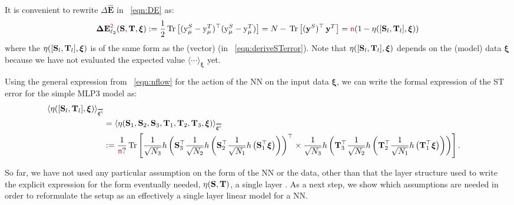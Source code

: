 It is convenient to rewrite $\Delta \mathbf{\hat{E}}$ in \EQN~\ref{eqn:DE} as:
\begin{align}
\label{eqn:DE2}
\mathbf{\Delta {E}}^{{\color{red}\sf{2}}}_{\ell_2}({\mathbf{S}},{\mathbf{T}}, \boldsymbol{\xi})
   := \frac{1}{2} \mbox{}\operatorname{Tr}\left[ (\mathrm{y}_{\mu}^{S} - \mathrm{y}_{\mu}^{T})^\top (\mathrm{y}_{\mu}^{S} - \mathrm{y}_{\mu}^{T}) \right]
   = N - \mbox{}\operatorname{Tr}\left[ (\mathbf{y}^{S})^{\top} \, \mathbf{y}^{T}  \right]
   = {\color{red}\sf{n}}(1 - \eta([{\mathbf{S}}_l,{\mathbf{T}}_l],\boldsymbol{\xi}))
\end{align}
where the \SelfOverlap $\eta([{\mathbf{S}}_l,{\mathbf{T}}_l],\boldsymbol{\xi})$
is of the same form as the (vector) \LinearPerceptron (in \EQN~\ref{eqn:deriveSTerror}).
Note that $\eta([{\mathbf{S}}_l,{\mathbf{T}}_l],\boldsymbol{\xi})$ depends on the (model) data $\boldsymbol{\xi}$
because we have not evaluated the expected value $\langle \cdots \rangle_{\boldsymbol{\xi}}$ yet.

Using the general expression from \EQN~\ref{eqn:nflow} for the action of the NN on the input data $\boldsymbol{\xi}$,
we can write the formal expression of the ST error for the simple MLP3 model as:
\begin{align}
\label{eqn:overlap1}
\ETAMLPAVG  \\ \nonumber
& =\langle\ETA(\SMAT_1,\SMAT_2,\SMAT_3,\TMAT_1,\TMAT_2,\TMAT_3,\boldsymbol{\xi})\rangle_{\AVGNDXI}  \\ \nonumber
& :=  \frac{1}{\ND ?}\Trace{
    \frac{1}{\sqrt{N_3}} h\left(\SMAT_3^{\top} 
    \frac{1}{\sqrt{N_2}} h\left(\SMAT_2^{\top} 
    \frac{1}{\sqrt{N_1}} h\left(\SMAT_1^{\top} \boldsymbol{\xi} \right)\right)\right)^{\top} 
    \times
    \frac{1}{\sqrt{N_3}} h\left(\TMAT_3^{\top} 
    \frac{1}{\sqrt{N_2}} h\left(\TMAT_2^{\top} 
    \frac{1}{\sqrt{N_1}} h\left(\TMAT_1^{\top} \boldsymbol{\xi} \right)\right)\right)
  }.
\end{align}

So far, we have not used any particular assumption on the form of the NN or the data, 
other than that the layer structure used to write the explicit expression for the form eventually needed,
$\eta({\mathbf{S}},{\mathbf{T}})$, a single layer \SelfOverlap.
As a next step, we show which assumptions are needed in order to reformulate the setup as
an effectively a single layer linear model for a NN.

